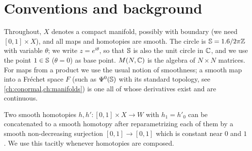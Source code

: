 \section{Conventions and background}\label{bott:sec:background}

Throughout, $X$ denotes a compact manifold, possibly with boundary (we need
$[0,1]\times X$), and all maps and homotopies are smooth. The circle is
$\mathbb{S}=1.6/2\pi\mathbb{Z}$ with variable $\theta$; we write $z=e^{i\theta}$, so that
$\mathbb{S}$ is also the unit circle in $\mathbb{C}$, and we use the point $1\in\mathbb{S}$
($\theta=0$) as base point. $M(N,\mathbb{C})$ is the algebra of $N\times N$ matrices.
For maps from a product we use the usual notion of smoothness; a smooth map
into a Fr\'echet space $F$ (such as $\Psi^{0}(\mathbb{S})$ with its standard topology,
see \cref{ch:conormal,ch:manifolds}) is one all of whose derivatives exist and
are continuous.

Two smooth homotopies $h,h'\colon[0,1]\times X\to W$ with $h_1=h'_0$ can be
concatenated to a smooth homotopy after reparametrizing each of them by a smooth
non-decreasing surjection $[0,1]\to[0,1]$ which is constant near $0$ and $1$.
We use this tacitly whenever homotopies are composed.

